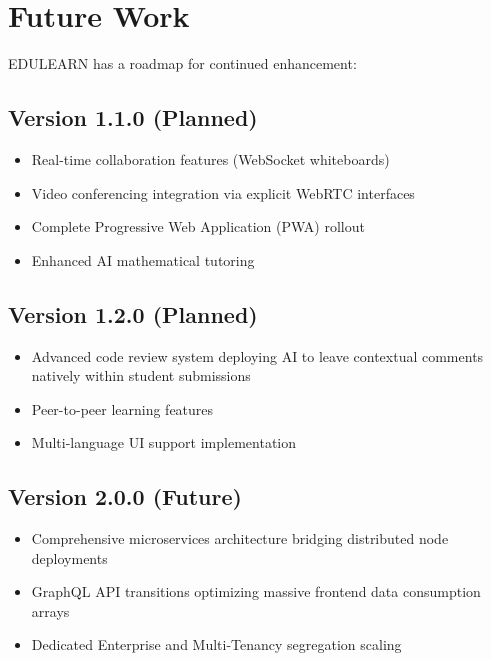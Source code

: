 \documentclass[conference]{IEEEtran}
\begin{document}
\section{Future Work}

EDULEARN has a roadmap for continued enhancement:

\subsection{Version 1.1.0 (Planned)}
\begin{itemize}
    \item Real-time collaboration features (WebSocket whiteboards)
    \item Video conferencing integration via explicit WebRTC interfaces
    \item Complete Progressive Web Application (PWA) rollout
    \item Enhanced AI mathematical tutoring
\end{itemize}

\subsection{Version 1.2.0 (Planned)}
\begin{itemize}
    \item Advanced code review system deploying AI to leave contextual comments natively within student submissions
    \item Peer-to-peer learning features
    \item Multi-language UI support implementation
\end{itemize}

\subsection{Version 2.0.0 (Future)}
\begin{itemize}
    \item Comprehensive microservices architecture bridging distributed node deployments
    \item GraphQL API transitions optimizing massive frontend data consumption arrays
    \item Dedicated Enterprise and Multi-Tenancy segregation scaling
\end{itemize}

\end{document}
